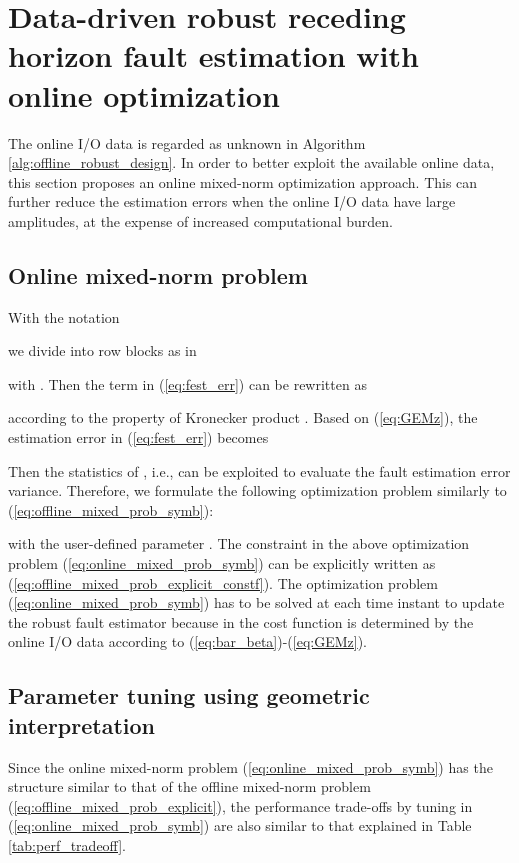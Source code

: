 \documentclass[twocolumn]{autart}
\begin{document}
\section{Data-driven robust receding horizon fault estimation with online optimization}\label{sect:dd_robust_onlineopt}
The online I/O data is regarded as unknown in Algorithm \ref{alg:offline_robust_design}. In order to better exploit the available online data, this section proposes an online mixed-norm optimization approach. This can further reduce the estimation errors when the online I/O data have large amplitudes, at the expense of increased computational burden.

\subsection{Online mixed-norm problem}
With the notation

we divide  into  row blocks as in

with . Then the term  in (\ref{eq:fest_err}) can be rewritten as

according to the property of Kronecker product \cite{Brew1978}. Based on (\ref{eq:GEMz}), the estimation error in (\ref{eq:fest_err}) becomes

Then the statistics of , i.e.,
 can be exploited to evaluate the fault estimation error variance.
Therefore, we formulate the following optimization problem similarly to (\ref{eq:offline_mixed_prob_symb}):

with the user-defined parameter . The constraint in the above optimization problem (\ref{eq:online_mixed_prob_symb}) can be explicitly written as (\ref{eq:offline_mixed_prob_explicit_constf}).
The optimization problem (\ref{eq:online_mixed_prob_symb}) has to be solved at each time instant to update the robust fault estimator  because  in the cost function is determined by the online I/O data according to (\ref{eq:bar_beta})-(\ref{eq:GEMz}).


\subsection{Parameter tuning using geometric interpretation}
Since the online mixed-norm problem (\ref{eq:online_mixed_prob_symb}) has the structure similar to that of the offline mixed-norm problem (\ref{eq:offline_mixed_prob_explicit}), the performance trade-offs by tuning  in (\ref{eq:online_mixed_prob_symb}) are also similar to that explained in Table \ref{tab:perf_tradeoff}.
\end{document}
